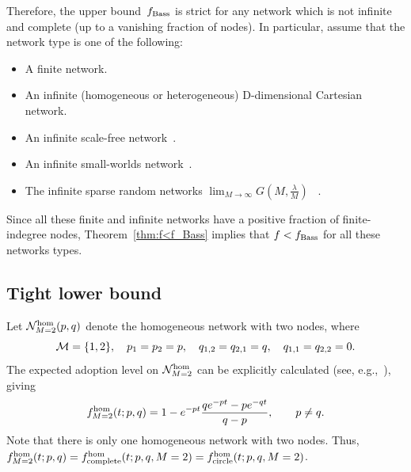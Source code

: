 \documentclass[review]{elsarticle}
\begin{document}
  
  
Therefore, the upper bound~$f_{\rm Bass}$ is strict for any network which is not  infinite and complete (up to a vanishing fraction of nodes). In particular, assume that the network type is one of the following: 
\begin{itemize}
	\item A finite network.
	\item An infinite (homogeneous or heterogeneous) D-dimensional Cartesian network.
	\item An infinite  scale-free network~\citep{barabasi1999emergence}.
	\item An infinite  small-worlds network~\citep{watts1998collective}.
	\item The infinite sparse random networks $\lim_{M \to \infty} G\left(M,\frac{\lambda}{M}\right)$ ~\citep{erdHos1960evolution}.
\end{itemize}
	Since all these finite and infinite networks have a positive fraction of finite-indegree nodes, Theorem~\ref{thm:f<f_Bass} implies that $f<f_{\rm Bass}$ for all these networks types. 


\subsection{Tight lower bound}

Let ${\cal N}_{M=2}^{\rm hom}(p,q)$ denote the
 homogeneous network with two nodes, where
\begin{equation}
\label{eq:N_M=2}
{\cal M} = \{1, 2\}, \quad  p_1=p_2 = p, \quad q_{1,2} = q_{2,1} = q, \quad q_{1,1} = q_{2,2} = 0.
\end{equation}
The expected adoption level on ${\cal N}_{M=2}^{\rm hom}$ can be explicitly calculated  (see, e.g.,~\cite{Bass-boundary-18}),  giving
\begin{equation}
\label{eq:f_all-M=2}
f_{M=2}^{\rm hom}(t;p,q)  = 1-e^{-pt}\frac{qe^{-pt}-pe^{-qt}}{q-p}, \qquad p \neq q.
\end{equation}
Note that there is only one homogeneous network with two nodes. Thus,
$f_{M=2}^{\rm hom}(t;p,q)  = f_{\rm complete}^{\rm hom}(t;p,q,M=2)  = f_{\rm circle}^{\rm hom}(t;p,q,M=2)$.
\end{document}
